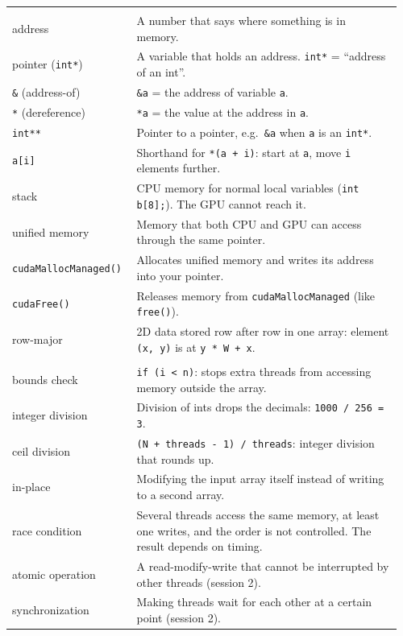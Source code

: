 \documentclass[main.tex]{subfiles}
\begin{document}
\begin{longtable}{@{}p{0.3\linewidth}p{0.66\linewidth}@{}}
\noalign{\medskip}
\multicolumn{2}{@{}l}{\textbf{Memory and pointers}}\\
address & A number that says where something is in memory.\\
pointer (\texttt{int*}) & A variable that holds an address. \texttt{int*} = ``address of an int''.\\
\texttt{\&} (address-of) & \texttt{\&a} = the address of variable \texttt{a}.\\
\texttt{*} (dereference) & \texttt{*a} = the value at the address in \texttt{a}.\\
\texttt{int**} & Pointer to a pointer, e.g.\ \texttt{\&a} when \texttt{a} is an \texttt{int*}.\\
\texttt{a[i]} & Shorthand for \texttt{*(a + i)}: start at \texttt{a}, move \texttt{i} elements further.\\
stack & CPU memory for normal local variables (\texttt{int b[8];}). The GPU cannot reach it.\\
unified memory & Memory that both CPU and GPU can access through the same pointer.\\
\texttt{cudaMallocManaged()} & Allocates unified memory and writes its address into your pointer.\\
\texttt{cudaFree()} & Releases memory from \texttt{cudaMallocManaged} (like \texttt{free()}).\\
row-major & 2D data stored row after row in one array: element \texttt{(x, y)} is at \texttt{y * W + x}.\\
\noalign{\medskip}
\multicolumn{2}{@{}l}{\textbf{Correctness}}\\
bounds check & \texttt{if (i < n)}: stops extra threads from accessing memory outside the array.\\
integer division & Division of ints drops the decimals: \texttt{1000 / 256 = 3}.\\
ceil division & \texttt{(N + threads - 1) / threads}: integer division that rounds up.\\
in-place & Modifying the input array itself instead of writing to a second array.\\
race condition & Several threads access the same memory, at least one writes, and the order is not controlled. The result depends on timing.\\
atomic operation & A read-modify-write that cannot be interrupted by other threads (session 2).\\
synchronization & Making threads wait for each other at a certain point (session 2).\\
\end{longtable}
\end{document}
